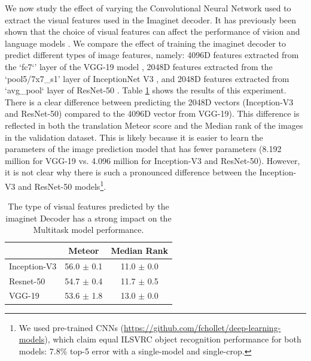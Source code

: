 We now study the effect of varying the Convolutional Neural Network used to extract the visual features used in the Imaginet decoder.
It has previously been shown that the choice of visual features can affect the performance of vision and language models \citep{Jabri2016,Kiela2016}.
We compare the effect of training the {\sc imaginet} decoder to predict different types of image features, namely: 4096D features extracted from the `fc7`' layer of the VGG-19 model \citep{simonyan2014very}, 2048D features extracted from the `pool5/7x7\_s1' layer of InceptionNet V3 \citep{Szegedy2015}, and 2048D features extracted from `avg\_pool` layer of ResNet-50 \citep{he2016deep}.
Table \ref{tab:results:features} shows the results of this experiment.
There is a clear difference between predicting the 2048D vectors (Inception-V3 and ResNet-50) compared to the 4096D vector from VGG-19).
This difference is reflected in both the translation Meteor score and the Median rank of the images in the validation dataset. This is likely because it is easier to learn the parameters of the image prediction model that has fewer parameters (8.192 million for VGG-19 vs. 4.096 million for Inception-V3 and ResNet-50).
However, it is not clear why there is such a pronounced difference between the Inception-V3 and ResNet-50 models\footnote{We used pre-trained CNNs (\url{https://github.com/fchollet/deep-learning-models}), which claim equal ILSVRC object recognition performance for both models: 7.8\% top-5 error with a single-model and single-crop.}.

\begin{table}
\centering
\renewcommand{\arraystretch}{1.3}
\begin{tabular}{lcc}
\toprule
& Meteor & Median Rank \\
\midrule
Inception-V3 & 56.0 $\pm$ 0.1 & 11.0 $\pm$ 0.0\\
Resnet-50 & 54.7 $\pm$ 0.4 & 11.7 $\pm$ 0.5 \\
VGG-19 & 53.6 $\pm$ 1.8 & 13.0 $\pm$ 0.0 \\
\bottomrule
\end{tabular}
\caption{The type of visual features predicted by the {\sc imaginet} Decoder has a strong impact on the Multitask model performance.}\label{tab:results:features}
\end{table}
